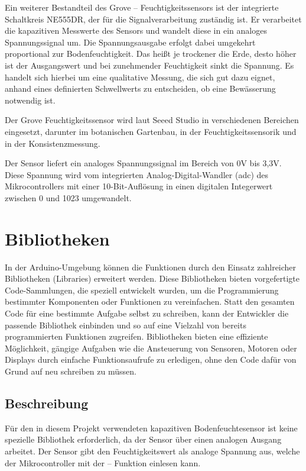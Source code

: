 		\vspace{1\baselineskip}

		Ein weiterer Bestandteil des Grove – Feuchtigkeitssensors ist der integrierte Schaltkreis NE555DR, der für die Signalverarbeitung zuständig ist. Er verarbeitet die kapazitiven Messwerte des Sensors und wandelt diese in ein analoges Spannungssignal um. Die Spannungsausgabe erfolgt dabei umgekehrt proportional zur Bodenfeuchtigkeit. Das heißt je trockener die Erde, desto höher ist der Ausgangswert und bei zunehmender Feuchtigkeit sinkt die Spannung. Es handelt sich hierbei um eine qualitative Messung, die sich gut dazu eignet, anhand eines definierten Schwellwerts zu entscheiden, ob eine Bewässerung notwendig ist.
		\cite{Texas:2016b}

		\vspace{1\baselineskip}

		Der Grove Feuchtigkeitssensor wird laut Seeed Studio in verschiedenen Bereichen eingesetzt, darunter im botanischen Gartenbau, in der Feuchtigkeitssensorik und in der Konsistenzmessung.
		\cite{Seeed_Datasheet:2019}
		
		Der Sensor liefert ein analoges Spannungssignal im Bereich von 0V bis 3,3V. Diese Spannung wird vom integrierten Analog-Digital-Wandler (\ac{adc}) des Mikrocontrollers mit einer 10-Bit-Auflösung in einen digitalen Integerwert zwischen 0 und 1023 umgewandelt. \cite{ArduinoReadAnalogeVoltage:2024} \cite{Bartlett:2023}
		
		
	\section{Bibliotheken}
		In der Arduino-Umgebung können die Funktionen durch den Einsatz zahlreicher Bibliotheken (Libraries) erweitert werden. Diese Bibliotheken bieten vorgefertigte Code-Sammlungen, die speziell entwickelt wurden, um die Programmierung bestimmter Komponenten oder Funktionen zu vereinfachen. Statt den gesamten Code für eine bestimmte Aufgabe selbst zu schreiben, kann der Entwickler die passende Bibliothek einbinden und so auf eine Vielzahl von bereits programmierten Funktionen zugreifen. Bibliotheken bieten eine effiziente Möglichkeit, gängige Aufgaben wie die Ansteuerung von Sensoren, Motoren oder Displays durch einfache Funktionsaufrufe zu erledigen, ohne den Code dafür von Grund auf neu schreiben zu müssen.
		\cite{Söderby:2024} \cite{SöderbyundHylen:2024} \cite{Barber:2020}
		
		
		\subsection{Beschreibung}
			Für den in diesem Projekt verwendeten kapazitiven Bodenfeuchtesensor ist keine spezielle Bibliothek erforderlich, da der Sensor über einen analogen Ausgang arbeitet. Der Sensor gibt den Feuchtigkeitswert als analoge Spannung aus, welche der Mikrocontroller mit der  – Funktion einlesen kann.  

